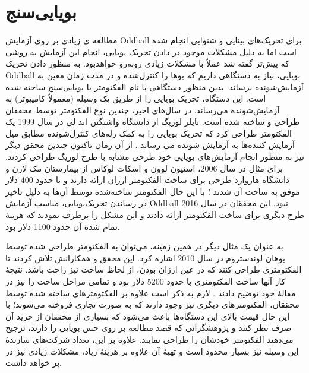 \documentclass[oneside]{report}
\begin{document}
\section*{بویایی‌سنج}
مطالعه ی زیادی بر روی آزمایش Oddball برای تحریک‌های بینایی و شنوایی انجام شده است اما به دلیل مشکلات موجود در دادن تحریک بویایی، انجام این آزمایش به روشی که پیش‌تر گفته شد عملاً با مشکلات زیادی رو‌به‌رو خواهد‌بود. به منظور دادن تحریک Oddball بویایی، نیاز به دستگاهی داریم که بوها را کنترل‌شده و در مدت زمان معین به آزمایش‌شونده برساند. 
بدین منظور دستگاهی با نام  الفکتومتر یا بویایی‌سنج
 ساخته شده است. این دستگاه، تحریک بویایی را از طریق یک وسیله (معمولاً کامپیوتر) به آزمایش‌شونده می‌رساند. در سال‌های اخیر، چندین نوع الفکتومتر توسط محققان طراحی و ساخته شده است. تایلر لوریگ
 از دانشگاه واشنگتن اند لی
 در سال 1999 یک الفکتومتر طراحی کرد که تحریک بویایی را به کمک رله‌های کنترل‌شونده مطابق میل آزمایش کننده‌ها به آزمایش شونده می رساند \cite{Elmes}.
 از آن زمان تا‌کنون چندین محقق دیگر نیز به منظور انجام آزمایش‌های بویایی خود طرحی مشابه با طرح لوریگ طراحی کردند. برای مثال در سال 2006، استیون لوون و اسکات لوکاس از بیمارستان مک لارن و دانشگاه هاروارد طرحی برای ساخت الفکتومتر ارزان ارائه دارند و با حدود 400 دلار موفق به ساخت آن شدند \cite{Lowen}؛
 با این حال الفکتومتر ساخته‌شده توسط آن‌ها به دلیل تاخیر در رساندن تحریک‌بویایی، مناسب آزمایش Oddball نبود.
این محققان در سال 2016 طرح دیگری برای ساخت الفکتومتر ارائه دادند و این مشکل را برطرف نمودند که هزینهٔ تمام شدهٔ آن حدود 1100 دلار بود.

به عنوان یک مثال دیگر در همین زمینه، می‌توان به الفکتومتر طراحی شده توسط یوهان لوندستروم در سال 2010 اشاره کرد. این محقق و همکارانش تلاش کردند تا الفکتومتری طراحی کنند که در عین ارزان بودن، از لحاظ ساخت نیز راحت باشد. نتیجهٔ کار آنها ساخت الفکتومتری با حدود 5200 دلار بود و تمامی مراحل ساخت را نیز در مقالهٔ خود توضیح دادند \cite{Lunder}.
لازم به ذکر است علاوه بر الفکتومترهای ساخته شده توسط محققان، الفکتومترهای دیگری نیز وجود دارند که به صورت تجاری فروخته می‌شوند؛ با این حال قیمت بالای این دستگاه‌ها باعث می‌شود که بسیاری از محققان از خرید آن صرف نظر کنند و پژوهشگرانی که قصد مطالعه بر روی حس بویایی را دارند، ترجیح می‌دهند الفکتومتر خودشان را طراحی نمایند. علاوه بر این، تعداد شرکت‌های سازندهٔ این وسیله نیز بسیار محدود است و تهیهٔ آن علاوه بر هزینهٔ زیاد، مشکلات زیادی نیز در بر خواهد داشت.
\end{document}
